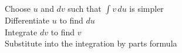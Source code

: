 \documentclass[preview]{standalone}
\begin{document}
Choose $u$ and $dv$ such that $\int v \, du$ is simpler\\Differentiate $u$ to find $du$\\Integrate $dv$ to find $v$\\Substitute into the integration by parts formula\\
\end{document}
